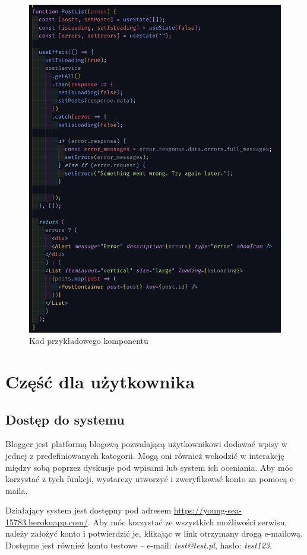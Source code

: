 \documentclass[declaration,shortabstract,polish,inz]{iithesis}
\begin{document}
\begin{figure}
    \centering
    \includegraphics[width=\textwidth]{images/komponent1.png}
    \caption{Kod przykładowego komponentu}
    \label{fig:komponent1}
\end{figure}

\chapter{Część dla użytkownika}
\section{Dostęp do systemu}
Blogger jest platformą blogową pozwalającą użytkownikowi dodawać wpisy w jednej z predefiniowanych kategorii. Mogą oni również wchodzić w interakcję między sobą poprzez dyskusje pod wpisami lub system ich oceniania. Aby móc korzystać z tych funkcji, wystarczy utworzyć i zweryfikować konto za pomocą e-maila.

Działający system jest dostępny pod adresem \url{https://young-sea-15783.herokuapp.com/}. Aby móc korzystać ze wszystkich możliwości serwisu, należy założyć konto i potwierdzić je, klikając w link otrzymany drogą e-mailową. Dostępne jest również konto testowe – e-mail: \textit{test@test.pl}, hasło: \textit{test123}.
\end{document}
